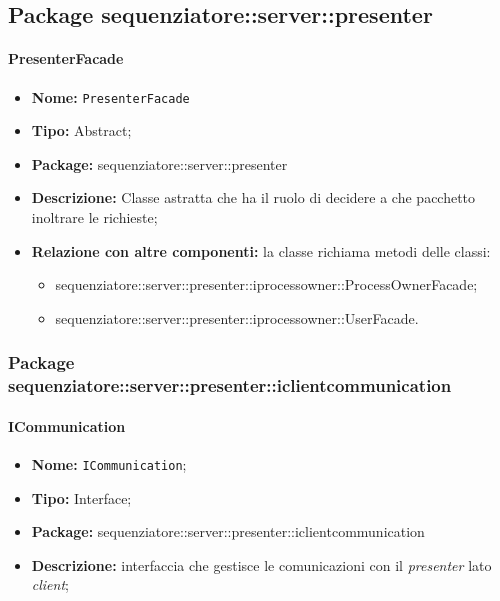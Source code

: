 \subsection{Package sequenziatore::server::presenter}
\paragraph{PresenterFacade}
	\begin{itemize}
		\item \textbf{Nome:} \texttt{PresenterFacade}
		\item \textbf{Tipo:} Abstract;
		\item \textbf{Package:} sequenziatore::server::presenter
		\item \textbf{Descrizione:} Classe astratta che ha il ruolo di decidere a che pacchetto inoltrare le richieste;
		\item \textbf{Relazione con altre componenti:} la classe richiama metodi delle classi:
		\begin{itemize}
			\item sequenziatore::server::presenter::iprocessowner::ProcessOwnerFacade;
			\item sequenziatore::server::presenter::iprocessowner::UserFacade.
		\end{itemize}
	\end{itemize}
\subsubsection{Package sequenziatore::server::presenter::iclientcommunication}
\paragraph{ICommunication}
	\begin{itemize}
		\item \textbf{Nome:} \texttt{ICommunication};
		\item \textbf{Tipo:} Interface;
		\item \textbf{Package:} sequenziatore::server::presenter::iclientcommunication
		\item \textbf{Descrizione:} interfaccia che gestisce le comunicazioni con il \textit{presenter} lato \textit{client};
	\end{itemize}
